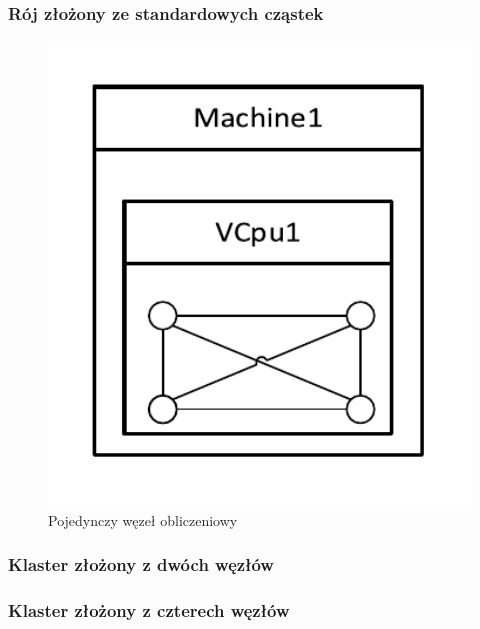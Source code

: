 \documentclass[12pt, twoside, openany, abstract=on]{report}
\theoremstyle{definition}
\begin{document}
\subsubsection{Rój złożony ze standardowych cząstek}
\begin{figure}[H]
    \centering
 \includegraphics[width=1\textwidth,natwidth=410,natheight=442]{klasterBbobNoGPU1Node.pdf}
 \caption{Pojedynczy węzeł obliczeniowy}
\end{figure}

\subsubsection{Klaster złożony z dwóch węzłów}

\subsubsection{Klaster złożony z czterech węzłów}
\end{document}
